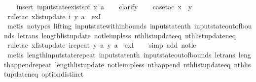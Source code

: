 \begin{isabellebody}
%
\isadelimproof
\ \ %
\endisadelimproof
%
\isatagproof
{}\isamarkupfalse%
\ {\isacharparenleft}insert\ input{}state{\isacharunderscore}exists{\isacharbrackleft}of\ x\ a{\isacharbrackright}{\isacharparenright}\isanewline
\ \ \isamarkupfalse%
\ clarify\isanewline
\ \ \isamarkupfalse%
\ {\isacharparenleft}case{\isacharunderscore}tac\ {\isachardoublequoteopen}x\ {\isasymge}\ y{\isachardoublequoteclose}{\isacharparenright}\isanewline
\ \ \isamarkupfalse%
\ {\isacharparenleft}rule{\isacharunderscore}tac\ x{\isacharequal}{\isachardoublequoteopen}list{\isacharunderscore}update\ i\ y\ a{\isachardoublequoteclose}\ \ exI{\isacharparenright}\isanewline
\ \ \isamarkupfalse%
\ {\isacharparenleft}metis\ {\isacharparenleft}no{\isacharunderscore}types{\isacharcomma}\ lifting{\isacharparenright}\ input{}state{\isacharunderscore}within{\isacharunderscore}bounds\ input{}state{\isacharunderscore}nth\ input{}state{\isacharunderscore}out{\isacharunderscore}of{\isacharunderscore}bounds\ le{\isacharunderscore}trans\ length{\isacharunderscore}list{\isacharunderscore}update\ not{\isacharunderscore}le{\isacharunderscore}imp{\isacharunderscore}less\ nth{\isacharunderscore}list{\isacharunderscore}update{\isacharunderscore}eq\ nth{\isacharunderscore}list{\isacharunderscore}update{\isacharunderscore}neq{\isacharparenright}\isanewline
\ \ \isamarkupfalse%
\ {\isacharparenleft}rule{\isacharunderscore}tac\ x{\isacharequal}{\isachardoublequoteopen}list{\isacharunderscore}update\ {\isacharparenleft}i{\isacharat}{\isacharparenleft}repeat\ y\ a{\isacharparenright}{\isacharparenright}\ y\ a{\isachardoublequoteclose}\ \ exI{\isacharparenright}\isanewline
\ \ \isamarkupfalse%
\ {\isacharparenleft}simp\ add{\isacharcolon}\ not{\isacharunderscore}le{\isacharparenright}\isanewline
\ \ \isamarkupfalse%
\ {\isacharparenleft}metis\ length{\isacharunderscore}input{}state{\isacharunderscore}repeat\ input{}state{\isacharunderscore}nth\ input{}state{\isacharunderscore}out{\isacharunderscore}of{\isacharunderscore}bounds\ le{\isacharunderscore}trans\ length{\isacharunderscore}append{\isacharunderscore}repeat\ length{\isacharunderscore}list{\isacharunderscore}update\ not{\isacharunderscore}le{\isacharunderscore}imp{\isacharunderscore}less\ nth{\isacharunderscore}append\ nth{\isacharunderscore}list{\isacharunderscore}update{\isacharunderscore}eq\ nth{\isacharunderscore}list{\isacharunderscore}update{\isacharunderscore}neq\ option{\isachardot}distinct{\isacharparenleft}{}{\isacharparenright}{\isacharparenright}%

\end{isabellebody}
